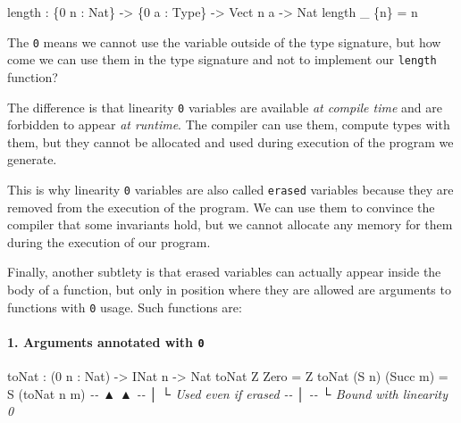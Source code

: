 \documentclass[
]{article}
\newenvironment{Shaded}{}{}
\newcommand{\CommentTok}[1]{\textcolor[rgb]{0.38,0.63,0.69}{\textit{#1}}}
\newcommand{\DataTypeTok}[1]{\textcolor[rgb]{0.56,0.13,0.00}{#1}}
\newcommand{\DecValTok}[1]{\textcolor[rgb]{0.25,0.63,0.44}{#1}}
\newcommand{\FunctionTok}[1]{\textcolor[rgb]{0.02,0.16,0.49}{#1}}
\newcommand{\NormalTok}[1]{#1}
\newcommand{\OperatorTok}[1]{\textcolor[rgb]{0.40,0.40,0.40}{#1}}
\newcommand{\OtherTok}[1]{\textcolor[rgb]{0.00,0.44,0.13}{#1}}
\begin{document}
\begin{Shaded}
\begin{Highlighting}[]
\FunctionTok{length} \OperatorTok{:}\NormalTok{ \{}\DecValTok{0}\NormalTok{ n }\OperatorTok{:} \DataTypeTok{Nat}\NormalTok{\} }\OtherTok{{-}\textgreater{}}\NormalTok{ \{}\DecValTok{0}\NormalTok{ a }\OperatorTok{:} \DataTypeTok{Type}\NormalTok{\} }\OtherTok{{-}\textgreater{}} \DataTypeTok{Vect}\NormalTok{ n a }\OtherTok{{-}\textgreater{}} \DataTypeTok{Nat}
\FunctionTok{length}\NormalTok{ \_ \{n\} }\OtherTok{=}\NormalTok{ n}
\end{Highlighting}
\end{Shaded}

The \texttt{0} means we cannot use the variable outside of the type
signature, but how come we can use them in the type signature and not to
implement our \texttt{length} function?

The difference is that linearity \texttt{0} variables are available
\emph{at compile time} and are forbidden to appear \emph{at runtime}.
The compiler can use them, compute types with them, but they cannot be
allocated and used during execution of the program we generate.

This is why linearity \texttt{0} variables are also called
\texttt{erased} variables because they are removed from the execution of
the program. We can use them to convince the compiler that some
invariants hold, but we cannot allocate any memory for them during the
execution of our program.

Finally, another subtlety is that erased variables can actually appear
inside the body of a function, but only in position where they are
allowed are arguments to functions with \texttt{0} usage. Such functions
are:

\hypertarget{arguments-annotated-with-0}{%
\paragraph{\texorpdfstring{1. Arguments annotated with
\texttt{0}}{1. Arguments annotated with 0}}\label{arguments-annotated-with-0}}

\begin{Shaded}
\begin{Highlighting}[]
\NormalTok{toNat }\OperatorTok{:}\NormalTok{ (}\DecValTok{0}\NormalTok{ n }\OperatorTok{:} \DataTypeTok{Nat}\NormalTok{) }\OtherTok{{-}\textgreater{}} \DataTypeTok{INat}\NormalTok{ n }\OtherTok{{-}\textgreater{}} \DataTypeTok{Nat}
\NormalTok{toNat }\DataTypeTok{Z} \DataTypeTok{Zero} \OtherTok{=} \DataTypeTok{Z}
\NormalTok{toNat (}\DataTypeTok{S}\NormalTok{ n) (}\DataTypeTok{Succ}\NormalTok{ m) }\OtherTok{=} \DataTypeTok{S}\NormalTok{ (toNat n m)}
\CommentTok{{-}{-}       ▲                      ▲}
\CommentTok{{-}{-}       │                      └ Used even if erased}
\CommentTok{{-}{-}       │}
\CommentTok{{-}{-}       └ Bound with linearity 0}
\end{Highlighting}
\end{Shaded}
\end{document}
